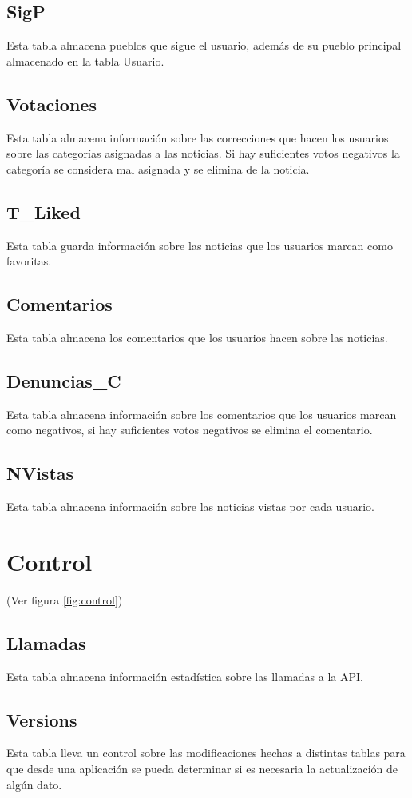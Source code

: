 \subsection{SigP}
Esta tabla almacena pueblos que sigue el usuario, además de su pueblo principal almacenado en la tabla Usuario.
\subsection{Votaciones}
Esta tabla almacena información sobre las correcciones que hacen los usuarios sobre las categorías asignadas a las noticias. Si hay suficientes votos negativos la categoría se considera mal asignada y se elimina de la noticia.
\subsection{T\_Liked}
Esta tabla guarda información sobre las noticias que los usuarios marcan como favoritas.
\subsection{Comentarios}
Esta tabla almacena los comentarios que los usuarios hacen sobre las noticias.
\subsection{Denuncias\_C}
Esta tabla almacena información sobre los comentarios que los usuarios marcan como negativos, si hay suficientes votos negativos se elimina el comentario.
\subsection{NVistas}
Esta tabla almacena información sobre las noticias vistas por cada usuario.
\section{Control}
(Ver figura \ref{fig:control})
\subsection{Llamadas}
Esta tabla almacena información estadística sobre las llamadas a la API.
\subsection{Versions}
Esta tabla lleva un control sobre las modificaciones hechas a distintas tablas para que desde una aplicación se pueda determinar si es necesaria la actualización de algún dato.